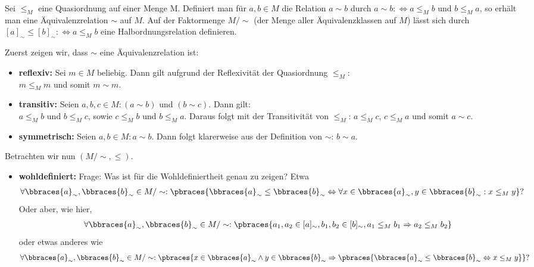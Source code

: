 \begin{exercise}
    Sei $\leq_M$ eine Quasiordnung auf einer Menge M. Definiert man für $a,b \in M$
    die Relation $a \sim b$ durch $a \sim b :\iff a \leq_M b$ und $ b \leq_M a$, so
    erhält man eine Äquivalenzrelation $\sim$ auf $M$. Auf der Faktormenge $M/\sim$
    (der Menge aller Äquivalenzklassen auf $M$) lässt sich durch $[a]_{\sim} \leq
    [b]_{\sim}: \iff a \leq_M b$ eine Halbordnungsrelation definieren.
\end{exercise}
\begin{solution}
Zuerst zeigen wir, dass $\sim$ eine Äquivalenzrelation ist: \\
\begin{itemize}
  \item \textbf{reflexiv:} Sei $m \in M$ beliebig. Dann gilt aufgrund der Reflexivität der Quasiordnung $\leq_M$: \\
  $m \leq_M m$ und somit $m \sim m$.
  \item \textbf{transitiv:} Seien $a,b,c \in M: (a \sim b)$ und $(b \sim c)$. Dann gilt: \\
  $a \leq_M b$ und $b \leq_M c$, sowie $c \leq_M b$ und $b \leq_M a$.
  Daraus folgt mit der Transitivität von $\leq_M$: $a \leq_M c$, $c \leq_M a$ und somit $a \sim c$.
  \item \textbf{symmetrisch:} Seien $a,b \in M: a \sim b$. Dann folgt klarerweise aus der Definition von $\sim$: $b \sim a$. \\
\end{itemize}
Betrachten wir nun $(M/\sim, \leq)$.
\begin{itemize}
  \item \textbf{wohldefiniert:} 
  Frage: Was ist für die Wohldefiniertheit genau zu zeigen? Etwa
  \begin{align*}
    \forall \bbraces{a}_\sim , \bbraces{b}_\sim \in M/\sim : \pbraces{\bbraces{a}_\sim \leq \bbraces{b}_\sim \Leftrightarrow \forall x \in \bbraces{a}_\sim, y \in \bbraces{b}_\sim: x \leq_M y} ?
  \end{align*}
  Oder aber, wie hier, 
  \begin{align*}
    \forall \bbraces{a}_\sim , \bbraces{b}_\sim \in M/\sim : \pbraces{a_1, a_2 \in [a]_{\sim}, b_1, b_2 \in [b]_{\sim}, a_1 \leq_M b_1 \Rightarrow a_2 \leq_M b_2}
  \end{align*}
  oder etwas anderes wie
  \begin{align*}
    \forall \bbraces{a}_\sim , \bbraces{b}_\sim \in M/\sim : \pbraces{x \in \bbraces{a}_\sim \land y \in \bbraces{b}_\sim \Rightarrow \pbraces{\bbraces{a}_\sim \leq \bbraces{b}_\sim \Leftrightarrow x \leq_M y}}?
  \end{align*}


\end{itemize}
\end{solution}
